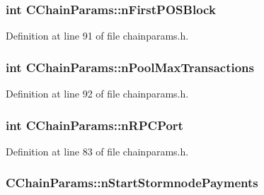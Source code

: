 \subsubsection[{n\+First\+P\+O\+S\+Block}]{\setlength{\rightskip}{0pt plus 5cm}int C\+Chain\+Params\+::n\+First\+P\+O\+S\+Block\hspace{0.3cm}{\ttfamily [protected]}}\label{class_c_chain_params_ac02f29aa14f74f88b64b7d8d71329a49}


Definition at line 91 of file chainparams.\+h.

\hypertarget{class_c_chain_params_addb1962eb12784aaea932fd49b5fd40b}{}
\subsubsection[{n\+Pool\+Max\+Transactions}]{\setlength{\rightskip}{0pt plus 5cm}int C\+Chain\+Params\+::n\+Pool\+Max\+Transactions\hspace{0.3cm}{\ttfamily [protected]}}\label{class_c_chain_params_addb1962eb12784aaea932fd49b5fd40b}


Definition at line 92 of file chainparams.\+h.

\hypertarget{class_c_chain_params_a0f7d46a1493876d522cb594cc8e7924f}{}
\subsubsection[{n\+R\+P\+C\+Port}]{\setlength{\rightskip}{0pt plus 5cm}int C\+Chain\+Params\+::n\+R\+P\+C\+Port\hspace{0.3cm}{\ttfamily [protected]}}\label{class_c_chain_params_a0f7d46a1493876d522cb594cc8e7924f}


Definition at line 83 of file chainparams.\+h.

\hypertarget{class_c_chain_params_a585cae2a6611f610e2ff269a8e9ada34}{}
\subsubsection[{n\+Start\+Stormnode\+Payments}]{ C\+Chain\+Params\+::n\+Start\+Stormnode\+Payments\hspace{0.3cm}{\ttfamily [protected]}}\label{class_c_chain_params_a585cae2a6611f610e2ff269a8e9ada34}


